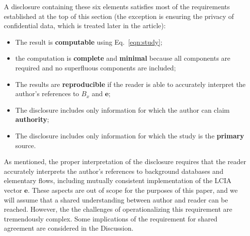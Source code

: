 A disclosure containing these six elements satisfies most of the requirements established at the top of this section (the exception is ensuring the privacy of confidential data, which is treated later in the article):
\begin{itemize}
  \item The result is \textbf{computable} using Eq.~\ref{eqn:study};
  \item the computation is \textbf{complete} and \textbf{minimal} because all components are required and no superfluous components are included;
  \item The results are \textbf{reproducible} if the reader is able to accurately interpret the author's references to $B_x$ and $\mathbf{e}$;
  \item The disclosure includes only information for which the author can claim \textbf{authority};
  \item The disclosure includes only information for which the study is the \textbf{primary} source.
\end{itemize}
As mentioned, the proper interpretation of the disclosure requires that the reader accurately interprets the author's references to background databases and elementary flows, including mutually consistent implementation of the LCIA vector $\mathbf{e}$.  These aspects are out of scope for the purposes of this paper, and we will assume that a shared understanding between author and reader can be reached.  However, the the challenges of operationalizing this requirement are tremendously complex.  Some implications of the requirement for shared agreement are considered in the Discussion.

